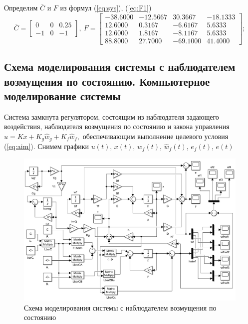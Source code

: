 \documentclass[a4paper, 12pt]{article}
\begin{document}
    Определим $\bar{C}$ и $F$ из формул (\ref{eq:sys}), (\ref{eq:F1})
    $$
    \bar{C}=\begin{bmatrix}
    0 &0 &0.25\\
   -1 &0 &-1
    \end{bmatrix},\ F=\begin{bmatrix}
    -38.6000  &-12.5667   &30.3667  &-18.1333\\
   12.6000    &0.3167   &-6.6167    &5.6333\\
   12.6000    &1.8167   &-8.1167    &5.6333\\
   88.8000   &27.7000  &-69.1000   &41.4000
    \end{bmatrix};
    $$


    \subsection{Схема моделирования системы с наблюдателем возмущения по состоянию. Компьютерное моделирование системы}
    Система замкнута регулятором, состоящим из наблюдателя задающего воздействия, 
    наблюдателя возмущения по состоянию и закона управления $u=Kx+K_g\hat{w}_g+K_f\hat{w}_f,$
    обеспечивающим выполнение целевого условия (\ref{eq:aim}). Снимем графики $u(t)$, $x(t)$, $w_f(t)$, $\hat{w}_f(t)$, $e_f(t)$, $e(t)$
    \begin{figure}[H]
        \centering
        \includegraphics[scale=0.5]{3task_scheme_1.png}
        \captionsetup{skip=0pt}
        \caption{Схема моделирования системы с наблюдателем возмущения по состоянию}
        \label{fig:3task_scheme_1}
    \end{figure}
\end{document}

